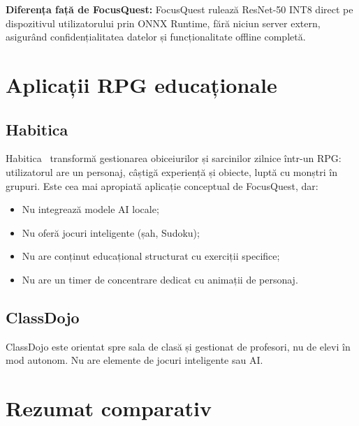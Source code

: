 \documentclass[12pt, a4paper, twoside]{report}
\numberwithin{equation}{section}
\begin{document}
\textbf{Diferența față de FocusQuest:} FocusQuest rulează ResNet-50 INT8 direct pe
dispozitivul utilizatorului prin ONNX Runtime, fără niciun server extern, asigurând
confidențialitatea datelor și funcționalitate offline completă.

\section{Aplicații RPG educaționale}

\subsection{Habitica}

Habitica~\cite{habitica} transformă gestionarea obiceiurilor și sarcinilor zilnice într-un RPG: utilizatorul
are un personaj, câștigă experiență și obiecte, luptă cu monștri în grupuri. Este cea mai
apropiată aplicație conceptual de FocusQuest, dar:
\begin{itemize}
  \item Nu integrează modele AI locale;
  \item Nu oferă jocuri inteligente (șah, Sudoku);
  \item Nu are conținut educațional structurat cu exerciții specifice;
  \item Nu are un timer de concentrare dedicat cu animații de personaj.
\end{itemize}

\subsection{ClassDojo}

ClassDojo este orientat spre sala de clasă și gestionat de profesori, nu de elevi în mod
autonom. Nu are elemente de jocuri inteligente sau AI.

\section{Rezumat comparativ}
\end{document}
